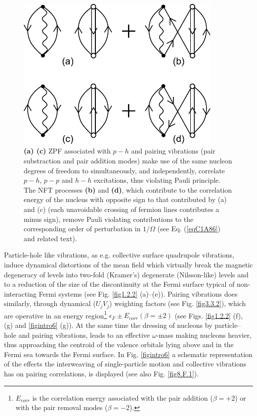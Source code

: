 \begin{figure}
\centerline {
\includegraphics*[width=10cm]{introduccion/figs/figintroF2}
}
\caption{ \textbf{(a) (c)}  ZPF associated with $p-h$ and pairing vibrations (pair substraction and pair addition modes) make use of the same nucleon degrees of freedom to simultaneously, and independently, correlate  $p-h$, $p-p$ and $h-h$ excitations, thus violating Pauli principle. The NFT processes \textbf{(b)} and \textbf{(d)}, which contribute to the correlation energy of the nucleus with opposite sign to that contributed by (a) and (c) (each unavoidable crossing of fermion lines contributes  a minus sign), remove Pauli violating contributions to the corresponding order of perturbation in $1/\Omega$ (see Eq. (\ref{eqC1A86}) and related text).}
\label{figintroF2}
\end{figure}
Particle-hole like vibrations, as e.g. collective surface quadrupole vibrations, induce dynamical distortions of the mean field which virtually break the  magnetic degeneracy of levels into two-fold (Kramer's) degenerate (Nilsson-like) levels and to a reduction of the size of the discontinuity at the Fermi surface typical of non-interacting Fermi systems (see Fig. \ref{fig1.2.2} (a)--(e)). Pairing vibrations does similarly, through dynamical ($U_jV_j$) weighting factors (see Fig. \ref{fig3.3.2}), which are operative in an energy region\footnote{$E_{corr}$ is the correlation energy associated with the pair addition ($\beta=+2$) or with the pair removal modes ($\beta=-2$).}  $\epsilon_F\pm E_{corr}(\beta=\pm2)$ (see Figs. \ref{fig1.2.2} (f), (g) and \ref{figintro6} (g)). At the same time the dressing of nucleons by particle--hole and pairing vibrations, leads to an effective $\omega$-mass making nucleons heavier, thus approaching the centroid of the valence orbitals lying above and in the Fermi sea towards the Fermi surface.  In Fig. \ref{figintro6} a schematic representation of the  effects the interweaving of single-particle motion and collective vibrations has on pairing correlations, is displayed (see also Fig. \ref{fig8.F.1}). 





